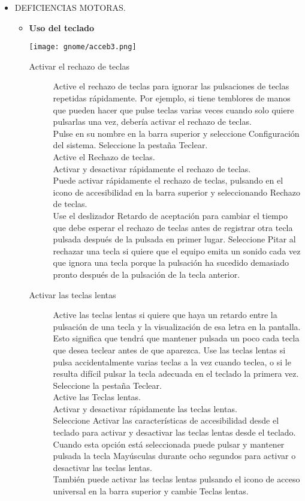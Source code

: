 \begin{itemize}
\item DEFICIENCIAS MOTORAS.
\begin{itemize}
\item {\large \bf Uso del teclado}
\begin{center}
\texttt{[image: gnome/acceb3.png]} 
\end{center}
			\begin{description}
				\item[Activar el rechazo de teclas] Active el rechazo de teclas para ignorar las pulsaciones de teclas repetidas rápidamente. Por ejemplo, si tiene temblores de manos que pueden hacer que pulse teclas varias veces cuando solo quiere pulsarlas una vez, debería activar el rechazo de teclas.\\
Pulse en su nombre en la barra superior y seleccione Configuración del sistema.
Seleccione la pestaña Teclear.\\
Active el Rechazo de teclas.\\

Activar y desactivar rápidamente el rechazo de teclas.\\
Puede activar rápidamente el rechazo de teclas, pulsando en el icono de accesibilidad en la barra superior y seleccionando Rechazo de teclas.\\

Use el deslizador Retardo de aceptación para cambiar el tiempo que debe esperar el rechazo de teclas antes de registrar otra tecla pulsada después de la pulsada en primer lugar. Seleccione Pitar al rechazar una tecla si quiere que el equipo emita un sonido cada vez que ignora una tecla porque la pulsación ha sucedido demasiado pronto después de la pulsación de la tecla anterior.
				\item[Activar las teclas lentas] Active las teclas lentas si quiere que haya un retardo entre la pulsación de una tecla y la visualización de esa letra en la pantalla. Esto significa que tendrá que mantener pulsada un poco cada tecla que desea teclear antes de que aparezca. Use las teclas lentas si pulsa accidentalmente varias teclas a la vez cuando teclea, o si le resulta difícil pulsar la tecla adecuada en el teclado la primera vez.\\
				
Seleccione la pestaña Teclear.\\
Active las Teclas lentas.\\

Activar y desactivar rápidamente las teclas lentas.\\
Seleccione Activar las características de accesibilidad desde el teclado para activar y desactivar las teclas lentas desde el teclado. Cuando esta opción está seleccionada puede pulsar y mantener pulsada la tecla Mayúsculas durante ocho segundos para activar o desactivar las teclas lentas.\\
También puede activar las teclas lentas pulsando el icono de acceso universal en la barra superior y cambie Teclas lentas.


\end{description}
\end{itemize}
\end{itemize}
